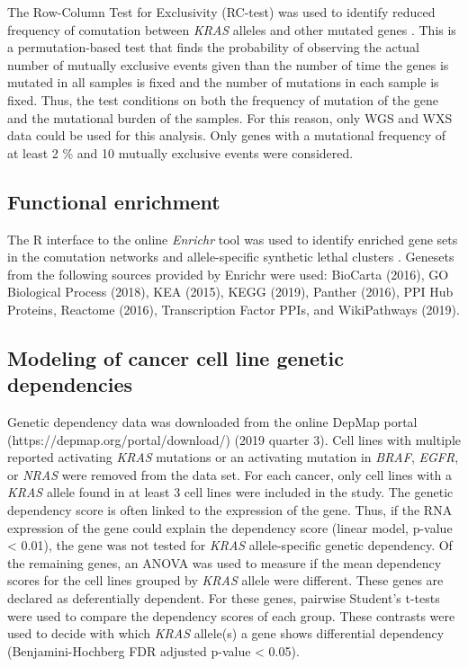 \documentclass[english, 10pt, letterpaper]{article}
\newcommand{\KRAS}{\emph{KRAS}}
\begin{document}
The Row-Column Test for Exclusivity (RC-test) was used to identify reduced frequency of comutation between \KRAS{} alleles and other mutated genes \cite{Leiserson2016}. 
This is a permutation-based test that finds the probability of observing the actual number of mutually exclusive events given than the number of time the genes is mutated in all samples is fixed and the number of mutations in each sample is fixed.
Thus, the test conditions on both the frequency of mutation of the gene and the mutational burden of the samples.
For this reason, only WGS and WXS data could be used for this analysis.
Only genes with a mutational frequency of at least 2 \% and 10 mutually exclusive events were considered.


\subsection*{Functional enrichment}
The R interface to the online \emph{Enrichr} tool was used to identify enriched gene sets in the comutation networks and allele-specific synthetic lethal clusters \cite{Chen2013, Kuleshov2016Enrichr:Update., R-enrichR}.
Genesets from the following sources provided by Enrichr were used: BioCarta (2016), GO Biological Process (2018), KEA (2015), KEGG (2019), Panther (2016), PPI Hub Proteins, Reactome (2016), Transcription Factor PPIs, and WikiPathways (2019).


\subsection*{Modeling of cancer cell line genetic dependencies}
Genetic dependency data was downloaded from the online DepMap portal (https://depmap.org/portal/download/) (2019 quarter 3).
Cell lines with multiple reported activating \KRAS{} mutations or an activating mutation in \emph{BRAF}, \emph{EGFR}, or \emph{NRAS} were removed from the data set.
For each cancer, only cell lines with a \KRAS{} allele found in at least 3 cell lines were included in the study.
The genetic dependency score is often linked to the expression of the gene.
Thus, if the RNA expression of the gene could explain the dependency score (linear model, p-value < 0.01), the gene was not tested for \KRAS{} allele-specific genetic dependency.
Of the remaining genes, an ANOVA was used to measure if the mean dependency scores for the cell lines grouped by \KRAS{} allele were different.
These genes are declared as deferentially dependent.
For these genes, pairwise Student's t-tests were used to compare the dependency scores of each group.
These contrasts were used to decide with which \KRAS{} allele(s) a gene shows differential dependency (Benjamini-Hochberg FDR adjusted p-value < 0.05).
\end{document}
